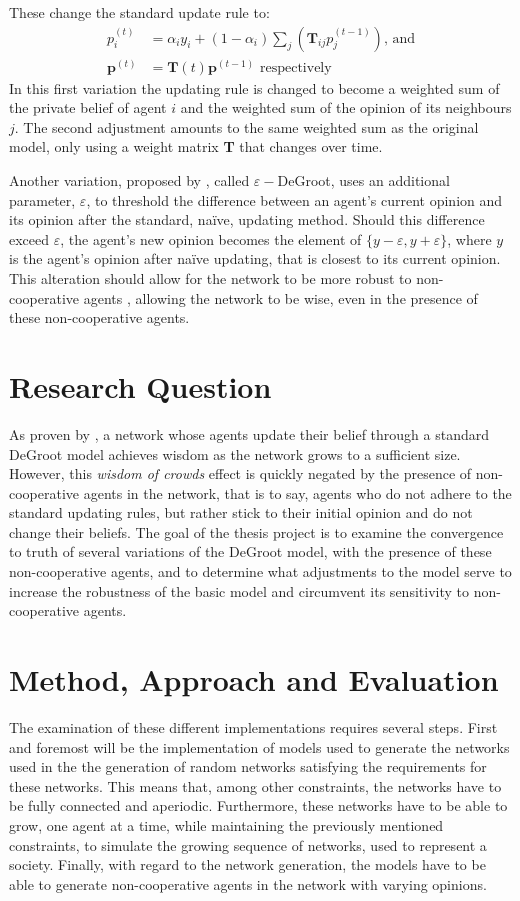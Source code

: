 \documentclass{article}
\begin{document}
These change the standard update rule to:
\begin{align*}
    p^{(t)}_{i} &= \alpha_i y_i + (1-\alpha_i)\sum_j(\textbf{T}_{ij}p_j^{(t-1)})\text{, and} \\
    \textbf{p}^{(t)} &= \textbf{T}(t)\textbf{p}^{(t-1)}\text{ respectively}
\end{align*}
In this first variation the updating rule is changed to become a weighted sum of the private belief of agent $i$ and the weighted sum of the opinion of its neighbours $j$. The second adjustment amounts to the same weighted sum as the original model, only using a weight matrix \textbf{T} that changes over time.

Another variation, proposed by \cite{amir2021robust}, called $\varepsilon-$DeGroot, uses an additional parameter, $\varepsilon$, to threshold the difference between an agent's current opinion and its opinion after the standard, na\"ive, updating method. Should this difference exceed $\varepsilon$, the agent's new opinion becomes the element of $\{y-\varepsilon, y+\varepsilon\}$, where $y$ is the agent's opinion after na\"ive updating, that is closest to its current opinion.
This alteration should allow for the network to be more robust to non-cooperative agents \cite{amir2021robust}, allowing the network to be wise, even in the presence of these non-cooperative agents.

\section*{Research Question}
As proven by \cite{golub2010naive}, a network whose agents update their belief through a standard DeGroot model achieves wisdom as the network grows to a sufficient size. However, this \textit{wisdom of crowds} effect is quickly negated by the presence of non-cooperative agents in the network, that is to say, agents who do not adhere to the standard updating rules, but rather stick to their initial opinion and do not change their beliefs. The goal of the thesis project is to examine the convergence to truth of several variations of the DeGroot model, with the presence of these non-cooperative agents, and to determine what adjustments to the model serve to increase the robustness of the basic model and circumvent its sensitivity to non-cooperative agents.


\section*{Method, Approach and Evaluation}
The examination of these different implementations requires several steps. First and foremost will be the implementation of models used to generate the networks used in the  the generation of random networks satisfying the requirements for these networks. This means that, among other constraints, the networks have to be fully connected and aperiodic. Furthermore, these networks have to be able to grow, one agent at a time, while maintaining the previously mentioned constraints, to simulate the growing sequence of networks, used to represent a society. Finally, with regard to the network generation, the models have to be able to generate non-cooperative agents in the network with varying opinions.
\end{document}
